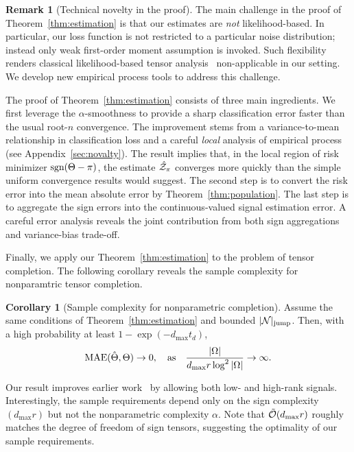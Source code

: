 \documentclass[twoside,11pt]{article}
\theoremstyle{definition}
\newtheorem{cor}{Corollary}
\newtheorem{rmk}{Remark}
\def\sign{\textup{sgn}}
\begin{document}
\begin{rmk}[Technical novelty in the proof] The main challenge in the proof of Theorem~\ref{thm:estimation} is that our estimates are \emph{not} likelihood-based. In particular, our loss function is not restricted to a particular noise distribution; instead only weak first-order moment assumption is invoked. Such flexibility renders classical likelihood-based tensor analysis~\citep{wang2018learning, ghadermarzy2018learning,zhang2018tensor} non-applicable in our setting. We develop new empirical process tools to address this challenge. 

The proof of Theorem~\ref{thm:estimation} consists of three main ingredients. We first leverage the $\alpha$-smoothness to provide a sharp classification error faster than the usual root-$n$ convergence. The improvement stems from a variance-to-mean relationship in classification loss and a careful \emph{local} analysis of empirical process (see Appendix~\ref{sec:novalty}). The result implies that, in the local region of risk minimizer $\sign(\Theta-\pi)$, the estimate $\hat {\mathcal{Z}}_\pi$ converges more quickly than the simple uniform convergence results would suggest. The second step is to convert the risk error into the mean absolute error by Theorem~\ref{thm:population}. The last step is to aggregate the sign errors into the continuous-valued signal estimation error. A careful error analysis reveals the joint contribution from both sign aggregations and variance-bias trade-off.
\end{rmk}



Finally, we apply our Theorem~\ref{thm:estimation} to the problem of tensor completion. The following corollary reveals the sample complexity for nonparamtric tensor completion. 
\begin{cor}[Sample complexity for nonparametric completion]\label{cor:completion}Assume the same conditions of Theorem~\ref{thm:estimation} and bounded $|\mathcal{N}|_{\text{jump}}$. Then, with a high probability at least $1-\exp(-d_{\max}t_d)$,
\[
\textup{MAE}(\hat \Theta, \Theta)\to 0, \quad \text{as}\quad {|\Omega|\over {d_{\max}r} \log^2 |\Omega|}\to \infty.
\]
\end{cor}
Our result improves earlier work~\citep{yuan2016tensor,ghadermarzy2019near,pmlr-v119-lee20i} by allowing both low- and high-rank signals. Interestingly, the sample requirements depend only on the sign complexity $(d_{\max}r)$ but not the nonparametric complexity $\alpha$. Note that $\tilde {\mathcal{O}}(d_{\max}r)$ roughly matches the degree of freedom of sign tensors, suggesting the optimality of our sample requirements. 
\end{document}
